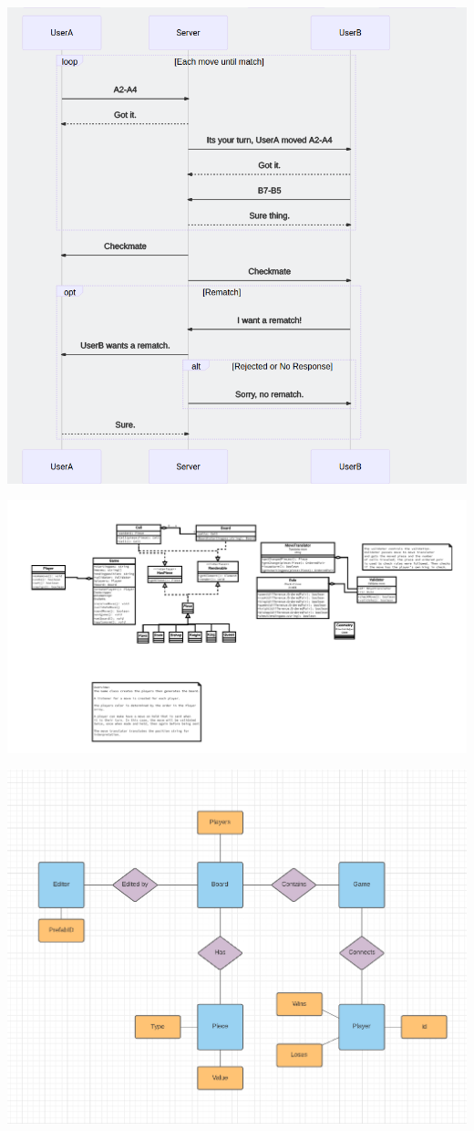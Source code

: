 \begin{center}
	\includegraphics[width=.9\linewidth]{../diagrams/out/Sequence3.png}
\end{center}
\begin{center}
	\includegraphics[width=.9\linewidth]{../diagrams/out/ClassDiagram.png}
\end{center}
\begin{center}
	\includegraphics[width=.9\linewidth]{../diagrams/out/ERDiagram.png}
\end{center}